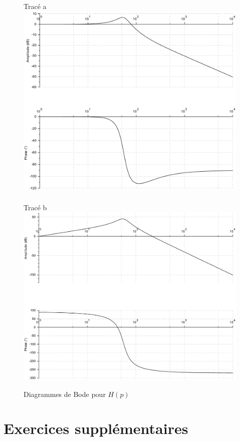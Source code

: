 \begin{figure}[!h]
 \centering	Tracé a \\
 \includegraphics[width=0.7\linewidth]{img/bode3_1} \\ ~\ \\
 Tracé b \\
 \includegraphics[width=0.7\linewidth]{img/bode3_2}
 \caption{Diagrammes de Bode pour $H(p)$}
 \label{img10}
\end{figure}


\section{Exercices supplémentaires}

